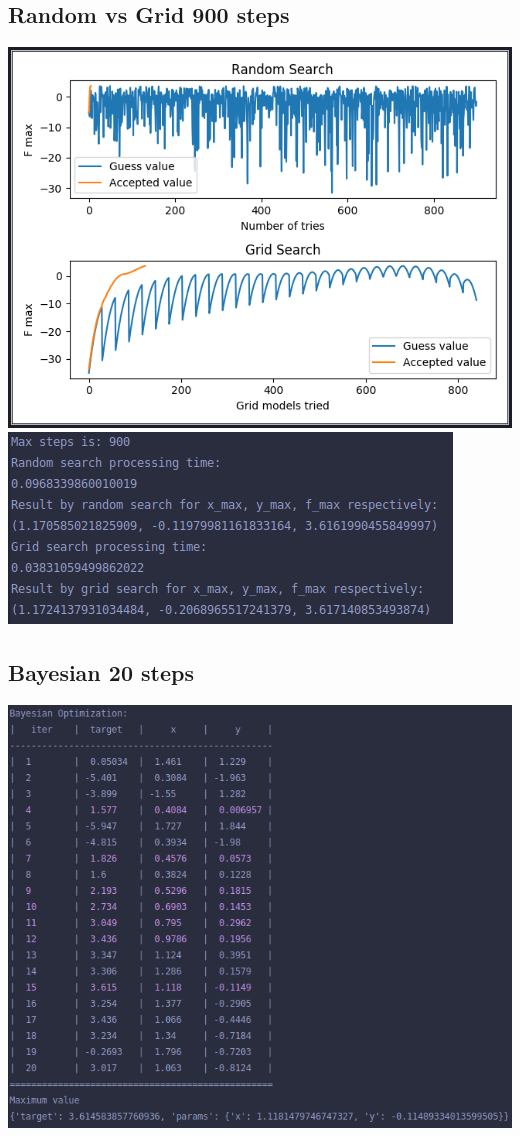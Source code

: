 \documentclass[12pt]{article}
\begin{document}
      \subsection*{Random vs Grid 900 steps}
        \begin{center}
          \includegraphics{../RandomVsGrid900Plot.png}
          \includegraphics{../RandomVsGrid900Result.png}
        \end{center}
      \subsection*{Bayesian 20 steps}
        \begin{center}
          \includegraphics{../BayesianResult.png}
        \end{center}
\end{document}
